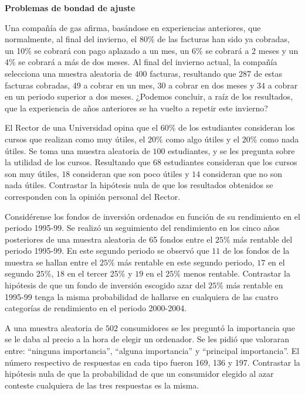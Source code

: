 \documentclass[12pt]{article}\usepackage[]{graphicx}\usepackage[]{color}
\begin{document}


\textbf{Problemas de bondad de ajuste}
\begin{prob}
Una compañía de gas afirma, basándose en experiencias anteriores, que normalmente, al final
del invierno, el 80\% de las facturas han sido ya cobradas, un 10\% se cobrará con pago
aplazado a un mes, un 6\% se cobrará a 2 meses y un 4\% se cobrará a más de dos meses. Al
final del invierno actual, la compañía selecciona una muestra aleatoria de $400$ facturas,
resultando que 287 de estas facturas cobradas, 49 a cobrar en un mes, $30$ a cobrar en dos
meses y $34$ a cobrar en un periodo superior a dos meses. ¿Podemos concluir, a raíz de los
resultados, que la experiencia de años anteriores se ha vuelto a repetir este invierno?
\end{prob}

\begin{prob}
El Rector de una Universidad opina que el $60\%$ de los estudiantes consideran los cursos
que realizan como muy útiles, el $20\%$ como algo útiles y el $20\%$ como nada útiles. Se
toma una muestra aleatoria de $100$ estudiantes, y se les pregunta sobre la utilidad de los
cursos. Resultando que $68$ estudiantes consideran que los cursos son muy útiles, $18$
consideran que son poco útiles y $14$ consideran que no son nada útiles. Contrastar la
hipótesis nula de que los resultados obtenidos se corresponden con la opinión personal del
Rector.
\end{prob}

\begin{prob}
Considérense los fondos de inversión ordenados en función de su rendimiento en el periodo
1995-99. Se realizó un seguimiento del rendimiento en los cinco años posteriores de una
muestra aleatoria de 65 fondos entre el $25\%$ más rentable del periodo 1995-99. En este
segundo periodo se observó que $11$ de los fondos de la muestra se hallan entre el $25\%$
más rentable en este segundo periodo, $17$ en el segundo $25\%$, $18$ en el tercer 25\% y
$19$ en el $25\%$ menos rentable. Contrastar la hipótesis de que un fondo de inversión
escogido azar del $25\%$ más rentable en 1995-99 tenga la misma probabilidad de hallarse en
cualquiera de las cuatro categorías de rendimiento en el periodo 2000-2004.
\end{prob}

\begin{prob}
A una muestra aleatoria de $502$ consumidores se les preguntó la
importancia que se le daba al precio a la hora de elegir un
ordenador. Se les pidió que valoraran entre: ``ninguna
importancia'', ``alguna importancia'' y ``principal importancia''. El
número respectivo de respuestas en cada tipo fueron 169, 136 y 197.
Contrastar la hipótesis nula de que la probabilidad de que un
consumidor elegido al azar conteste cualquiera de las tres
respuestas es la misma.
\end{prob}
\end{document}
